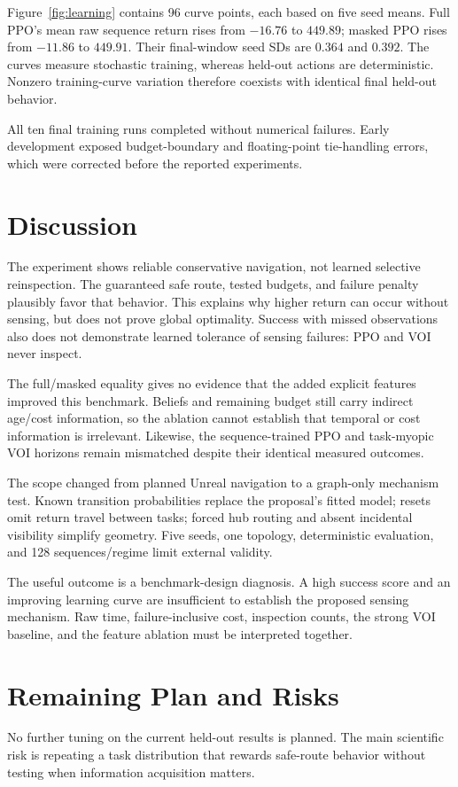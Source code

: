 \documentclass[journal]{IEEEtai}
\begin{document}
Figure~\ref{fig:learning} contains 96 curve points, each based on five seed means. Full PPO's mean raw sequence return rises from $-16.76$ to $449.89$; masked PPO rises from $-11.86$ to $449.91$. Their final-window seed SDs are $0.364$ and $0.392$. The curves measure stochastic training, whereas held-out actions are deterministic. Nonzero training-curve variation therefore coexists with identical final held-out behavior.

All ten final training runs completed without numerical failures. Early development exposed budget-boundary and floating-point tie-handling errors, which were corrected before the reported experiments.

\section{Discussion}
The experiment shows reliable conservative navigation, not learned selective reinspection. The guaranteed safe route, tested budgets, and failure penalty plausibly favor that behavior. This explains why higher return can occur without sensing, but does not prove global optimality. Success with missed observations also does not demonstrate learned tolerance of sensing failures: PPO and VOI never inspect.

The full/masked equality gives no evidence that the added explicit features improved this benchmark. Beliefs and remaining budget still carry indirect age/cost information, so the ablation cannot establish that temporal or cost information is irrelevant. Likewise, the sequence-trained PPO and task-myopic VOI horizons remain mismatched despite their identical measured outcomes.

The scope changed from planned Unreal navigation to a graph-only mechanism test. Known transition probabilities replace the proposal's fitted model; resets omit return travel between tasks; forced hub routing and absent incidental visibility simplify geometry. Five seeds, one topology, deterministic evaluation, and 128 sequences/regime limit external validity.

The useful outcome is a benchmark-design diagnosis. A high success score and an improving learning curve are insufficient to establish the proposed sensing mechanism. Raw time, failure-inclusive cost, inspection counts, the strong VOI baseline, and the feature ablation must be interpreted together.

\section{Remaining Plan and Risks}
No further tuning on the current held-out results is planned. The main scientific risk is repeating a task distribution that rewards safe-route behavior without testing when information acquisition matters.
\end{document}
